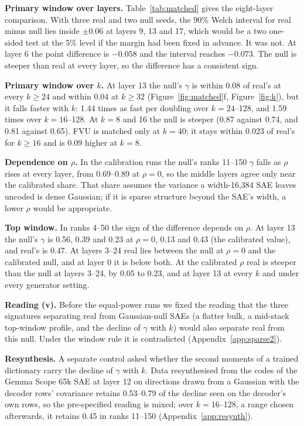 \documentclass[10pt,twocolumn]{article}
\begin{document}
\textbf{Primary window over layers.} Table~\ref{tab:matched} gives the eight-layer comparison. With three real and two null seeds, the 90\% Welch interval for real minus null lies inside $\pm 0.06$ at layers 9, 13 and 17, which would be a two one-sided test at the 5\% level if the margin had been fixed in advance. It was not. At layer 6 the point difference is $-0.058$ and the interval reaches $-0.073$. The null is steeper than real at every layer, so the difference has a consistent sign.

\textbf{Primary window over $k$.} At layer 13 the null's $\gamma$ is within 0.08 of real's at every $k\ge 24$ and within 0.04 at $k\ge 32$ (Figure~\ref{fig:matched}f, Figure~\ref{fig:k}), but it falls faster with $k$: 1.44 times as fast per doubling over $k=24$--128, and 1.59 times over $k=16$--128. At $k=8$ and 16 the null is steeper (0.87 against 0.74, and 0.81 against 0.65). FVU is matched only at $k=40$; it stays within 0.023 of real's for $k\ge 16$ and is 0.09 higher at $k=8$.

\textbf{Dependence on $\rho$.} In the calibration runs the null's ranks 11--150 $\gamma$ falls as $\rho$ rises at every layer, from 0.69--0.89 at $\rho=0$, so the middle layers agree only near the calibrated share. That share assumes the variance a width-16,384 SAE leaves uncoded is dense Gaussian; if it is sparse structure beyond the SAE's width, a lower $\rho$ would be appropriate.

\textbf{Top window.} In ranks 4--50 the sign of the difference depends on $\rho$. At layer 13 the null's $\gamma$ is 0.56, 0.39 and 0.23 at $\rho=0$, 0.13 and 0.43 (the calibrated value), and real's is 0.47. At layers 3--24 real lies between the null at $\rho=0$ and the calibrated null, and at layer 0 it is below both. At the calibrated $\rho$ real is steeper than the null at layers 3--24, by 0.05 to 0.23, and at layer 13 at every $k$ and under every generator setting.

\textbf{Reading (v).} Before the equal-power runs we fixed the reading that the three signatures separating real from Gaussian-null SAEs (a flatter bulk, a mid-stack top-window profile, and the decline of $\gamma$ with $k$) would also separate real from this null. Under the window rule it is contradicted (Appendix~\ref{app:sparse2}).

\textbf{Resynthesis.} A separate control asked whether the second moments of a trained dictionary carry the decline of $\gamma$ with $k$. Data resynthesised from the codes of the Gemma Scope 65k SAE at layer 12 on directions drawn from a Gaussian with the decoder rows' covariance retains 0.53--0.79 of the decline seen on the decoder's own rows, so the pre-specified reading is mixed; over $k=16$--128, a range chosen afterwards, it retains 0.45 in ranks 11--150 (Appendix~\ref{app:resynth}).
\end{document}
